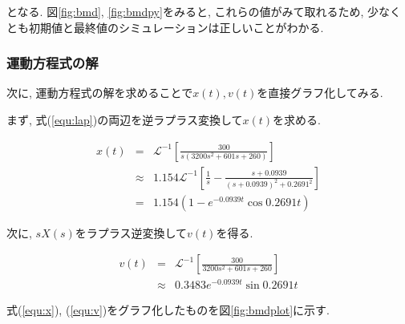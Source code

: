 \documentclass[titlepage]{jsarticle}
\begin{document}
            となる.
            図\ref{fig:bmd}, \ref{fig:bmdpy}をみると, これらの値がみて取れるため,
            少なくとも初期値と最終値のシミュレーションは正しいことがわかる.
            
        \subsubsection{運動方程式の解}
            次に, 運動方程式の解を求めることで$x(t), v(t)$を直接グラフ化してみる.

            まず, 式(\ref{equ:lap})の両辺を逆ラプラス変換して$x(t)$を求める.

            \begin{eqnarray}
                x(t) &=& \mathcal{L}^{-1}\left[\frac{300}{s(3200s^2+601s+260)}\right] \nonumber \\
                &\approx& 1.154\mathcal{L}^{-1}\left[\frac{1}{s} - \frac{s+0.0939}{(s+0.0939)^2 + 0.2691^2}\right] \nonumber \\
                &=& 1.154(1 - e^{-0.0939t}\cos{0.2691t}) \label{equ:x}
            \end{eqnarray}

            次に, $sX(s)$をラプラス逆変換して$v(t)$を得る.

            \begin{eqnarray}
                v(t) &=& \mathcal{L}^{-1}\left[\frac{300}{3200s^2 + 601s + 260}\right] \nonumber \\
                &\approx& 0.3483 e^{-0.0939t}\sin{0.2691t} \label{equ:v}
            \end{eqnarray}

            式(\ref{equ:x}), (\ref{equ:v})をグラフ化したものを図\ref{fig:bmdplot}に示す.
\end{document}
